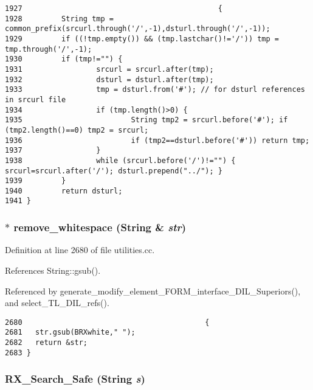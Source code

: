 \footnotesize\begin{verbatim}1927                                             {
1928         String tmp = common_prefix(srcurl.through('/',-1),dsturl.through('/',-1));
1929         if ((!tmp.empty()) && (tmp.lastchar()!='/')) tmp = tmp.through('/',-1);
1930         if (tmp!="") {
1931                 srcurl = srcurl.after(tmp);
1932                 dsturl = dsturl.after(tmp);
1933                 tmp = dsturl.from('#'); // for dsturl references in srcurl file
1934                 if (tmp.length()>0) {
1935                         String tmp2 = srcurl.before('#'); if (tmp2.length()==0) tmp2 = srcurl;
1936                         if (tmp2==dsturl.before('#')) return tmp;
1937                 }
1938                 while (srcurl.before('/')!="") { srcurl=srcurl.after('/'); dsturl.prepend("../"); }
1939         }
1940         return dsturl;
1941 }
\end{verbatim}\normalsize 
{}
\subsubsection{$\ast$ remove\_\-whitespace ({\bf String} \& {\em str})}\label{utilities_8cc_a81}




Definition at line 2680 of file utilities.cc.

References String::gsub().

Referenced by generate\_\-modify\_\-element\_\-FORM\_\-interface\_\-DIL\_\-Superiors(), and select\_\-TL\_\-DIL\_\-refs().



\footnotesize\begin{verbatim}2680                                          {
2681   str.gsub(BRXwhite," ");
2682   return &str;
2683 }
\end{verbatim}\normalsize 
{}
\subsubsection{ RX\_\-Search\_\-Safe ({\bf String} {\em s})}\label{utilities_8cc_a18}




